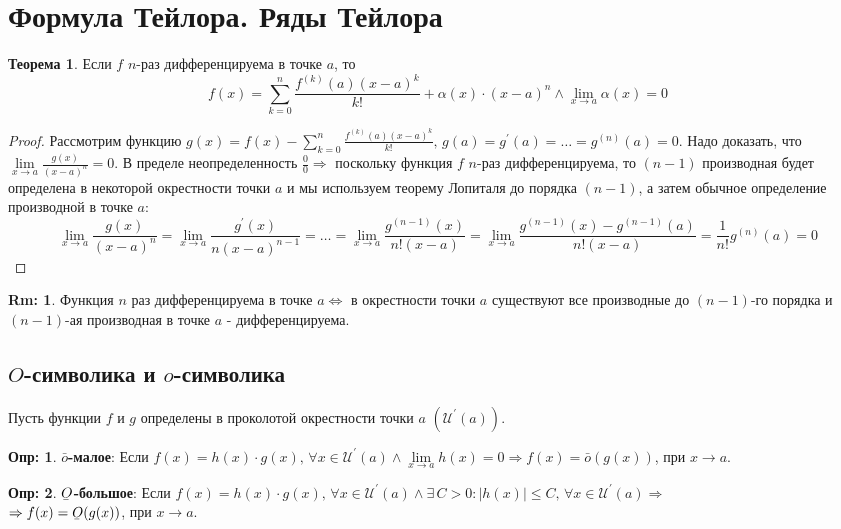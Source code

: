 \documentclass[12pt]{article}
\newcommand{\MU}{\mathcal{U}}
\theoremstyle{definition}
\newtheorem{defn}{Опр:}
\newtheorem{rem}{Rm:}
\newtheorem{theorem}{Теорема}
\newcommand{\ubar}[1]{\underaccent{\bar}{#1}}
\begin{document}

\section*{Формула Тейлора. Ряды Тейлора}

\begin{theorem}
	Если $f$ $n$-раз дифференцируема в точке $a$, то 
	$$f(x) = \sum\limits_{k = 0}^{n}\dfrac{f^{(k)}(a)(x-a)^k}{k!} + \alpha(x){\cdot}(x-a)^n \wedge \lim\limits_{x \to a} \alpha(x) = 0$$
\end{theorem}
\begin{proof}
	Рассмотрим функцию $g(x) = f(x) - \sum\limits_{k = 0}^{n}\tfrac{f^{(k)}(a)(x-a)^k}{k!}, \, g(a) = g^\prime(a) = \dotsc = g^{(n)}(a) = 0$. Надо доказать, что $\lim\limits_{x \to a}\tfrac{g(x)}{(x-a)^n} = 0$. В пределе неопределенность $\tfrac{0}{0}\Rightarrow$ поскольку функция $f$ $n$-раз дифференцируема, то $(n-1)$ производная будет определена в некоторой окрестности точки $a$ и мы используем теорему Лопиталя до порядка $(n-1)$, а затем обычное определение производной в точке $a$:
	$$\lim\limits_{x \to a}\dfrac{g(x)}{(x-a)^n} = \lim\limits_{x \to a}\dfrac{g^\prime(x)}{n(x-a)^{n-1}} = \dotsc = \lim\limits_{x \to a}\dfrac{g^{(n-1)}(x)}{n!(x-a)} = \lim\limits_{x \to a}\dfrac{g^{(n-1)}(x) -g^{(n-1)}(a) }{n!(x-a)}= \dfrac{1}{n!}g^{(n)}(a) = 0$$
\end{proof}
\begin{rem}
	Функция $n$ раз дифференцируема в точке $a \Leftrightarrow$ в окрестности точки $a$ существуют все производные до $(n-1)$-го порядка и $(n-1)$-ая производная в точке $a$ - дифференцируема.
\end{rem}

\subsection*{$O$-символика и $o$-символика}
Пусть функции $f$ и $g$ определены в проколотой окрестности точки $a$ $(\MU^\prime(a))$. 
\begin{defn}
	\textbf{$\bar{o}$-малое}: Если $f(x) = h(x){\cdot}g(x), \, \forall x \in \MU^\prime(a) \wedge \lim\limits_{x\to a}h(x) = 0 \Rightarrow f(x) = \bar{o}(g(x))$, при $x \to a$.
\end{defn}

\begin{defn}
	\textbf{$\ubar{O}$-большое}: Если $f(x) = h(x){\cdot}g(x), \, \forall x \in \MU^\prime(a) \wedge \exists \, C >0 \colon |h(x)| \leq C, \, \forall x \in \MU^\prime(a) \Rightarrow$ \\
	$\Rightarrow f(x) = \ubar{O}(g(x))$, при $x \to a$.
\end{defn}
\end{document}
